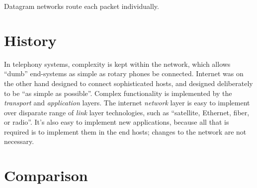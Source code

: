 \documentclass[10pt]{report}
\begin{document}
Datagram networks route each packet individually.

\section{History}

In telephony systems, complexity is kept within the network, which allows
``dumb'' end-systems as simple as rotary phones be connected.  Internet was on
the other hand designed to connect sophisticated hosts, and designed
deliberately to be ``as simple as possible''.  Complex functionality is
implemented by the {\em transport} and {\em application} layers.  The internet
{\em network} layer is easy to implement over disparate range of {\em link} layer
technologies, such as ``satellite, Ethernet, fiber, or radio''.  It's also easy
to implement new applications, because all that is required is to implement them
in the end hosts; changes to the network are not necessary.
\cite[pp349--351]{kurose}

\section{Comparison}
\end{document}
